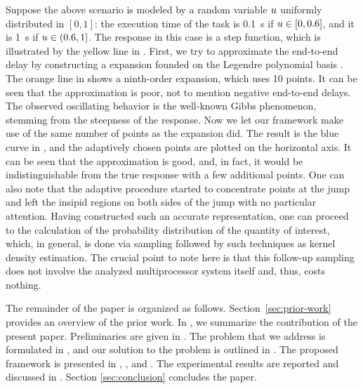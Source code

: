 Suppose the above scenario is modeled by a random variable $u$ uniformly
distributed in $[0, 1]$: the execution time of the task is 0.1~s if $u \in [0,
0.6]$, and it is 1~s if $u \in (0.6, 1]$. The response in this case is a step
function, which is illustrated by the yellow line in . First,
we try to approximate the end-to-end delay by constructing a  expansion
founded on the Legendre polynomial basis \cite{xiu2010}. The orange line in
 shows a ninth-order  expansion, which uses 10 points.
It can be seen that the approximation is poor, not to mention negative
end-to-end delays. The observed oscillating behavior is the well-known Gibbs
phenomenon, stemming from the steepness of the response. Now we let our
framework make use of the same number of points as the  expansion did.
The result is the blue curve in , and the adaptively chosen
points are plotted on the horizontal axis. It can be seen that the approximation
is good, and, in fact, it would be indistinguishable from the true response with
a few additional points. One can also note that the adaptive procedure started
to concentrate points at the jump and left the insipid regions on both sides of
the jump with no particular attention. Having constructed such an accurate
representation, one can proceed to the calculation of the probability
distribution of the quantity of interest, which, in general, is done via
sampling followed by such techniques as kernel density estimation. The crucial
point to note here is that this follow-up sampling does not involve the analyzed
multiprocessor system itself and, thus, costs nothing.

The remainder of the paper is organized as follows. Section~\ref{sec:prior-work}
provides an overview of the prior work. In , we summarize the
contribution of the present paper. Preliminaries are given in
. The problem that we address is formulated in
, and our solution to the problem is outlined in
. The proposed framework is presented in ,
, and . The experimental results are reported
and discussed in . Section \ref{sec:conclusion}
concludes the paper.
